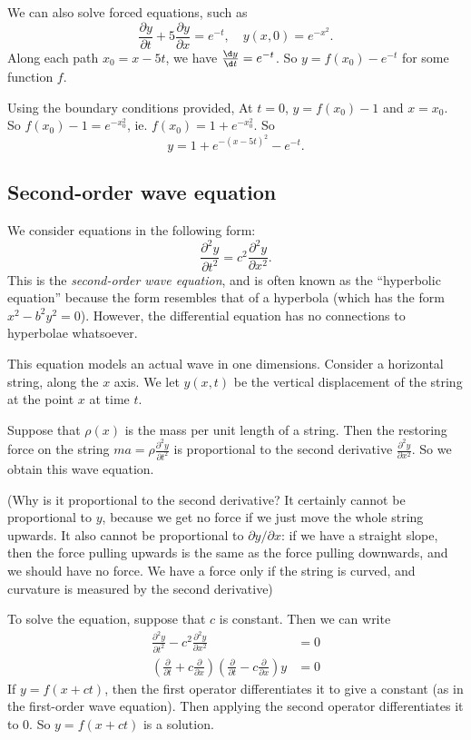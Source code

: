 \documentclass[a4paper]{article}
\begin{document}
We can also solve forced equations, such as
\[
  \frac{\partial y}{\partial t} + 5\frac{\partial y}{\partial x} = e^{-t},\quad y(x, 0) = e^{-x^2}.
\]
Along each path $x_0 = x - 5t$, we have $\frac{\d y}{\d t} = e^{-t}$. So $y = f(x_0) - e^{-t}$ for some function $f$.

Using the boundary conditions provided, At $t = 0$, $y = f(x_0) - 1$ and $x = x_0$. So $f(x_0) - 1 = e^{-x_0^2}$, ie. $f(x_0) = 1 + e^{-x_0^2}$. So
\[
  y = 1 + e^{-(x - 5t)^2} - e^{-t}.
\]
\subsection{Second-order wave equation}
We consider equations in the following form:
\[
  \frac{\partial ^2 y}{\partial t^2} = c^2 \frac{\partial^2 y}{\partial x^2}.
\]
This is the \emph{second-order wave equation}, and is often known as the ``hyperbolic equation'' because the form resembles that of a hyperbola (which has the form $x^2 - b^2 y^2 = 0$). However, the differential equation has no connections to hyperbolae whatsoever.

This equation models an actual wave in one dimensions. Consider a horizontal string, along the $x$ axis. We let $y(x, t)$ be the vertical displacement of the string at the point $x$ at time $t$.
\begin{center}
\end{center}
Suppose that $\rho(x)$ is the mass per unit length of a string. Then the restoring force on the string $\displaystyle ma = \rho \frac{\partial ^2 y}{\partial t^2}$ is proportional to the second derivative $\displaystyle\frac{\partial^2 y}{\partial x^2}$. So we obtain this wave equation.

(Why is it proportional to the second derivative? It certainly cannot be proportional to $y$, because we get no force if we just move the whole string upwards. It also cannot be proportional to $\partial y/\partial x$: if we have a straight slope, then the force pulling upwards is the same as the force pulling downwards, and we should have no force. We have a force only if the string is curved, and curvature is measured by the second derivative)

To solve the equation, suppose that $c$ is constant. Then we can write
\begin{align*}
  \frac{\partial ^2 y}{\partial t^2} - c^2 \frac{\partial^2 y}{\partial x^2} &= 0\\
  \left(\frac{\partial}{\partial t} + c\frac{\partial}{\partial x}\right)\left(\frac{\partial}{\partial t} - c\frac{\partial}{\partial x}\right) y &= 0
\end{align*}
If $y = f(x + ct)$, then the first operator differentiates it to give a constant (as in the first-order wave equation). Then applying the second operator differentiates it to $0$. So $y = f(x + ct)$ is a solution.
\end{document}
